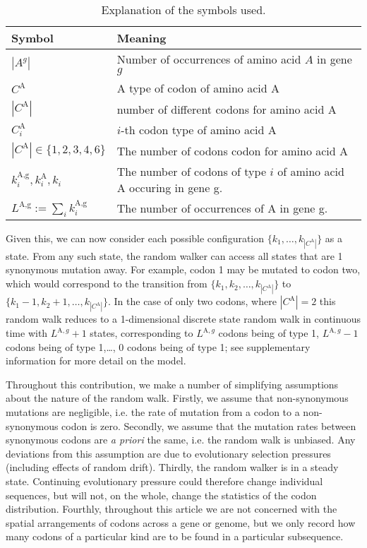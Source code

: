 \documentclass[a4paper,10pt]{paper}%
\begin{document}
%
%
\begin{table}
\centering
\begin{tabular}{|l|l|}
{\bf Symbol}& {\bf Meaning} \\\hline
$|A^g|$ 		& 	 Number of occurrences of  amino acid $A$ in gene $g$\\\hline
$C^\textrm{A}$ 		& 		A type of codon of amino acid A\\\hline
$|C^\textrm{A}|$ 		& number of  different codons for  amino acid A\\\hline
$C_i^\textrm{A}$ 		& 		$i$-th  codon type of amino acid A\\\hline
$|C^\textrm{A}|\in \{1,2,3,4,6\}$ 		& 		The number of codons codon for  amino acid A\\\hline
$k^\textrm{A,g}_i,k^\textrm{A}_i, k_i$ 		& The number of codons of type $i$ of amino acid A occuring in gene g.\\\hline
$L^\textrm{A,g} := \sum_i k^\textrm{A,g}_i$ 		& 		The number of occurrences of  A in gene g.\\\hline
\end{tabular}
\caption{Explanation of the symbols used.}
\label{symbols}
\end{table}
%
%
\par
Given this, we can now consider each possible configuration $\{k_1,\ldots, k_{|C^\textrm{A}|}\}$ as a  state. From any such state, the random walker can access all states that are 1 synonymous mutation away. %
For example, codon 1 may be mutated to codon two, which would correspond to the transition from $\{k_1, k_2, \ldots, k_{|C^\textrm{A}|}\}$  to $\{k_1-1,k_2+1, \ldots, k_{|C^\textrm{A}|}\}$. In the case of only two codons, where  $|C^\textrm{A}|=2$ this random walk reduces to a 1-dimensional discrete state random walk in continuous time with $L^{\textrm{A},g} +1$ states, corresponding to $L^{\textrm{A},g}$ codons being of type 1, $L^{\textrm{A},g}-1$ codons being of type 1,\ldots, $0$ codons being of type 1;     see supplementary information for more detail on the model. 
\par%
Throughout this contribution, we make a number of simplifying assumptions about the nature of  the random walk. Firstly, we assume that non-synonymous mutations are negligible, i.e. the rate of mutation from a codon to a non-synonymous codon is zero. Secondly, we  assume that the mutation rates between synonymous codons are {\em a priori} the same, i.e. the random walk is unbiased. Any deviations from this assumption are due to evolutionary selection pressures (including effects of random drift).   Thirdly, the random walker is  in  a steady state. Continuing evolutionary pressure could therefore change individual sequences, but will not, on the whole, change the statistics of the codon distribution. Fourthly, throughout this article we are not concerned with the spatial arrangements of codons across a gene or genome, but we only record how many codons of a particular kind are to be found in a particular subsequence.    
\end{document}
